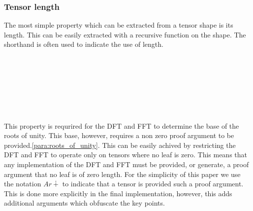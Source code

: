 \subsubsection{Tensor length}
The most simple property which can be extracted from a tensor shape is its length.
This can be easily extracted with a recursive function on the shape.
The shorthand \AF{\#} is often used to indicate the use of length.
\begin{code}%
%
\>[2]\AgdaSpace{}%
\AgdaSymbol{:}\AgdaSpace{}%
\AgdaSpace{}%
\AgdaSpace{}%
\<%
\\
%
\>[2]\AgdaSpace{}%
\AgdaSymbol{(}\AgdaSpace{}%
\AgdaSymbol{)}\AgdaSpace{}%
\AgdaSymbol{=}\AgdaSpace{}%
\<%
\\
%
\>[2]\AgdaSpace{}%
\AgdaSymbol{(}\AgdaSpace{}%
\AgdaSpace{}%
\AgdaSymbol{)}\AgdaSpace{}%
\AgdaSymbol{=}\AgdaSpace{}%
\AgdaSpace{}%
\AgdaSpace{}%
\AgdaOperator{\AgdaPrimitive{*}}\AgdaSpace{}%
\AgdaSpace{}%
\<%
\\
%
\\[\AgdaEmptyExtraSkip]%
%
\\[\AgdaEmptyExtraSkip]%
%
\>[2]\AgdaFunction{\#}\AgdaSpace{}%
\AgdaSymbol{:}\AgdaSpace{}%
\AgdaSpace{}%
\AgdaSpace{}%
\<%
\\
%
\>[2]\AgdaFunction{\#}\AgdaSpace{}%
\AgdaSymbol{=}\AgdaSpace{}%
\<%
\end{code}

This property is requrired for the DFT and FFT to determine the base of the
roots of unity.
This base, however, requires a non zero proof argument to be provided.\ref{para:roots_of_unity}.
This can be easily achived by restricting the DFT and FFT to operate only on
tensors where no leaf is zero.
This means that any implementation of the DFT and FFT must be provided, or generate,
a proof argument that no leaf is of zero length.
For the simplicity of this paper we use the notation $Ar∔$ %
to indicate that a tensor is provided such a proof argument.
This is done more explicitly in the final implementation, however, this 
adds additional arguments which obfuscate the key points.


